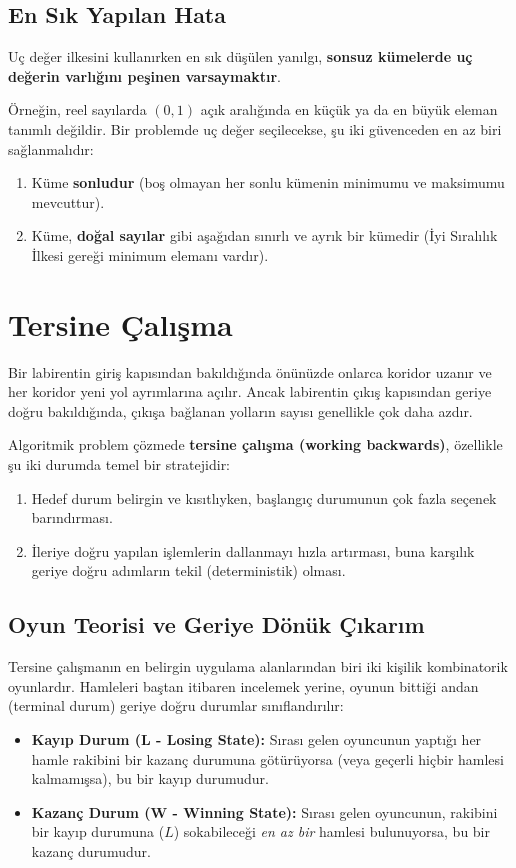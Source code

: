 \subsection*{En Sık Yapılan Hata}

Uç değer ilkesini kullanırken en sık düşülen yanılgı, \textbf{sonsuz kümelerde uç değerin varlığını peşinen varsaymaktır}. 

Örneğin, reel sayılarda $(0, 1)$ açık aralığında en küçük ya da en büyük eleman tanımlı değildir. Bir problemde uç değer seçilecekse, şu iki güvenceden en az biri sağlanmalıdır:
\begin{enumerate}
    \item Küme \textbf{sonludur} (boş olmayan her sonlu kümenin minimumu ve maksimumu mevcuttur).
    \item Küme, \textbf{doğal sayılar} gibi aşağıdan sınırlı ve ayrık bir kümedir (İyi Sıralılık İlkesi gereği minimum elemanı vardır).
\end{enumerate}

\section{Tersine Çalışma}

Bir labirentin giriş kapısından bakıldığında önünüzde onlarca koridor uzanır ve her koridor yeni yol ayrımlarına açılır. Ancak labirentin çıkış kapısından geriye doğru bakıldığında, çıkışa bağlanan yolların sayısı genellikle çok daha azdır.

Algoritmik problem çözmede \textbf{tersine çalışma (working backwards)}, özellikle şu iki durumda temel bir stratejidir:
\begin{enumerate}
    \item Hedef durum belirgin ve kısıtlıyken, başlangıç durumunun çok fazla seçenek barındırması.
    \item İleriye doğru yapılan işlemlerin dallanmayı hızla artırması, buna karşılık geriye doğru adımların tekil (deterministik) olması.
\end{enumerate}

\subsection{Oyun Teorisi ve Geriye Dönük Çıkarım}

Tersine çalışmanın en belirgin uygulama alanlarından biri iki kişilik kombinatorik oyunlardır. Hamleleri baştan itibaren incelemek yerine, oyunun bittiği andan (terminal durum) geriye doğru durumlar sınıflandırılır:
\begin{itemize}
    \item \textbf{Kayıp Durum (L - Losing State):} Sırası gelen oyuncunun yaptığı her hamle rakibini bir kazanç durumuna götürüyorsa (veya geçerli hiçbir hamlesi kalmamışsa), bu bir kayıp durumudur.
    \item \textbf{Kazanç Durum (W - Winning State):} Sırası gelen oyuncunun, rakibini bir kayıp durumuna ($L$) sokabileceği \emph{en az bir} hamlesi bulunuyorsa, bu bir kazanç durumudur.
\end{itemize}

